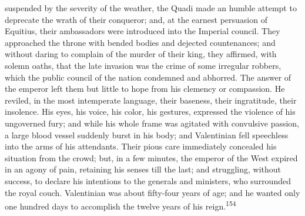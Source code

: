 suspended by the severity of the weather, the Quadi made an
humble attempt to deprecate the wrath of their conqueror; and, at
the earnest persuasion of Equitius, their ambassadors were
introduced into the Imperial council. They approached the throne
with bended bodies and dejected countenances; and without daring
to complain of the murder of their king, they affirmed, with
solemn oaths, that the late invasion was the crime of some
irregular robbers, which the public council of the nation
condemned and abhorred. The answer of the emperor left them but
little to hope from his clemency or compassion. He reviled, in
the most intemperate language, their baseness, their ingratitude,
their insolence. His eyes, his voice, his color, his gestures,
expressed the violence of his ungoverned fury; and while his
whole frame was agitated with convulsive passion, a large blood
vessel suddenly burst in his body; and Valentinian fell
speechless into the arms of his attendants. Their pious care
immediately concealed his situation from the crowd; but, in a few
minutes, the emperor of the West expired in an agony of pain,
retaining his senses till the last; and struggling, without
success, to declare his intentions to the generals and ministers,
who surrounded the royal couch. Valentinian was about fifty-four
years of age; and he wanted only one hundred days to accomplish
the twelve years of his reign.\textsuperscript{154}




